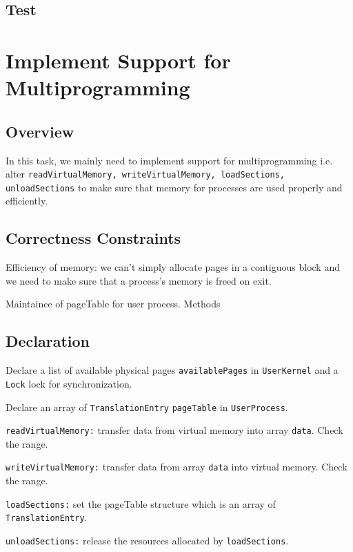 \documentclass{article}
\begin{document}
\subsection{Test}

\section{Implement Support for Multiprogramming}
\subsection{Overview}
In this task, we mainly need to implement support for multiprogramming i.e. alter \texttt{readVirtualMemory, writeVirtualMemory, loadSections,
unloadSections} to make sure that memory for processes are used properly and efficiently.
\subsection{Correctness Constraints}
\begin{compactitem}
\item Efficiency of memory: we can't simply allocate pages in a contiguous block and we need to make sure that a process's memory is freed on exit.
\item Maintaince of pageTable for user process. Methods
\end{compactitem}
\subsection{Declaration}
\begin{compactitem}
\item Declare a list of available physical pages \texttt{availablePages} in \texttt{UserKernel} and a \texttt{Lock} lock for synchronization.
\item Declare an array of \texttt{TranslationEntry} \texttt{pageTable} in \texttt{UserProcess}.
\item \texttt{readVirtualMemory:} transfer data from virtual memory into array \texttt{data}. Check the range.
\item \texttt{writeVirtualMemory:} transfer data from array \texttt{data} into virtual memory. Check the range.
\item \texttt{loadSections:} set the pageTable structure which is an array of \texttt{TranslationEntry}.
\item \texttt{unloadSections:} release the resources allocated by \texttt{loadSections}.
\end{compactitem}
\end{document}

